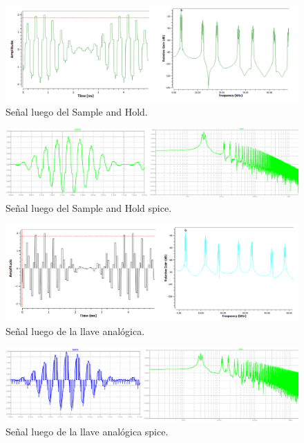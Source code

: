 \begin{figure}[H]
	\centering
	\includegraphics[width=1\textwidth]{ImagenesEjercicio7/sh.PNG}
\caption{Señal luego del Sample and Hold.}
	\label{fig:sh}
\end{figure}

\begin{figure}[H]
	\centering
	\includegraphics[width=1\textwidth]{ImagenesEjercicio7/ssh.PNG}
\caption{Señal luego del Sample and Hold spice.}
	\label{fig:ssh}
\end{figure}

\begin{figure}[H]
	\centering
	\includegraphics[width=1\textwidth]{ImagenesEjercicio7/analog.PNG}
\caption{Señal luego de la llave analógica.}
	\label{fig:analog}
\end{figure}

\begin{figure}[H]
	\centering
	\includegraphics[width=1\textwidth]{ImagenesEjercicio7/sanalog.PNG}
\caption{Señal luego de la llave analógica spice.}
	\label{fig:sanalog}
\end{figure}

